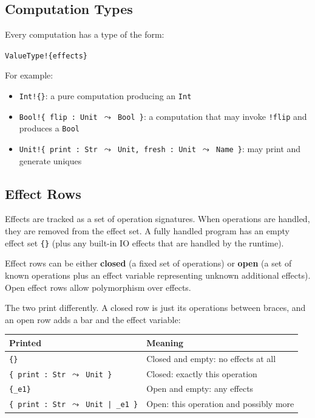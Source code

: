 \documentclass[11pt,a4paper]{article}
\begin{document}
\subsection{Computation Types}

Every computation has a type of the form:

\begin{center}
\texttt{ValueType!\{effects\}}
\end{center}

For example:

\begin{itemize}
  \item \texttt{Int!\{\}}: a pure computation producing an \texttt{Int}
  \item \texttt{Bool!\{ flip : Unit \(\leadsto\) Bool \}}: a computation
        that may invoke \texttt{!flip} and produces a \texttt{Bool}
  \item \texttt{Unit!\{ print : Str \(\leadsto\) Unit, fresh : Unit
        \(\leadsto\) Name \}}: may print and generate uniques
\end{itemize}

\subsection{Effect Rows}

Effects are tracked as a set of operation signatures.  When operations are
handled, they are removed from the effect set.  A fully handled program has an
empty effect set \texttt{\{\}} (plus any built-in IO effects that are handled
by the runtime).

Effect rows can be either \textbf{closed} (a fixed set of operations) or
\textbf{open} (a set of known operations plus an effect variable representing
unknown additional effects).  Open effect rows allow polymorphism over effects.

The two print differently.  A closed row is just its operations between
braces, and an open row adds a bar and the effect variable:

\begin{center}
\begin{tabular}{ll}
\toprule
\textbf{Printed} & \textbf{Meaning} \\
\midrule
\texttt{\{\}}                        & Closed and empty: no effects at all \\
\texttt{\{ print : Str \(\leadsto\) Unit \}} & Closed: exactly this operation \\
\texttt{\{\_e1\}}                    & Open and empty: any effects \\
\texttt{\{ print : Str \(\leadsto\) Unit | \_e1 \}} & Open: this operation and possibly more \\
\bottomrule
\end{tabular}
\end{center}
\end{document}
